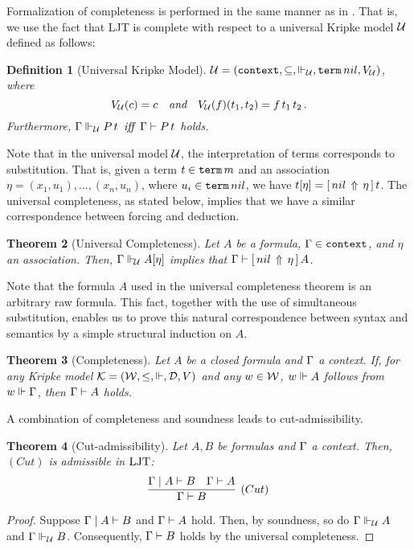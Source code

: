 \documentclass{kms-j}
\theoremstyle{plain}
\newtheorem{thm}{Theorem}[section]
\newtheorem{defi}[thm]{Definition}
\theoremstyle{remark}
\begin{document}
Formalization of completeness is performed in the same manner as in \citep{wollic09}.
That is, we use the fact that LJT is complete with respect to a universal Kripke model
$\calu$ defined as follows:

\begin{defi}[Universal Kripke Model]\label{def:universal}
$\calu = (\tcontext, \subseteq, \Vd_\calu, \tpterm\, nil, V_\calu)$, where
  \[
  V_\calu(c) = c \quad\textit{and}\quad V_\calu(f)(t_1, t_2) = f\, t_1\, t_2\, .
  \]
Furthermore, $\Ga \Vd_\calu P\, t \textit{ \,iff\, } \Ga \vd P\,t$ holds.
\end{defi}

Note that in the universal model $\calu$, the interpretation of
terms corresponds to substitution. That is, given a term $t \in\tpterm
\, m$ and an association $\eta = (x_1,u_1),...,(x_n, u_n)$, where $u_i
\in \tterm \,nil$, we have $t[\eta] = \substa{t}{\eta}{nil}$. The universal completeness, as stated
below, implies that we have a similar correspondence between forcing and deduction.

\begin{thm}[Universal Completeness]\label{universal}
  Let $A$ be a formula, $\Ga \in \tcontext$, and $\eta$ an
  association. Then, $\Ga \Vd_{\!\calu} A [\eta]$ implies that $\Ga \vd  \substa{A}{\eta}{nil}$.
\end{thm}

Note that the formula $A$ used in the universal completeness theorem is an arbitrary raw formula.
This fact, together with the use of simultaneous substitution, enables us to prove this natural correspondence
between syntax and semantics by a simple structural induction on $A$.

\begin{thm}[Completeness]\label{completeness}
  Let $A$ be a closed formula and $\Ga$ a context. If, for any Kripke model
  $\calk = (\calw, \le, \Vd, \cald, V)$ and any $w \in \calw$, $w \Vd A$
  follows from $w \Vd \Ga$, then $\Ga \vd A$ holds.
\end{thm}


A combination of completeness and soundness leads to cut-admissibility.

\begin{thm}[Cut-admissibility]
  Let $A, B$ be formulas and $\Ga$ a context. Then, $(Cut)$ is admissible in $\ljt$:
  \begin{equation*}
    \vcenter{\infer[(Cut)]{\Ga \vd B}{\Ga \mid A \vd B & \Ga \vd A}}
  \end{equation*}
\end{thm}
\begin{proof}
Suppose $\Ga \mid A \vd B$ and $\Ga \vd A$ hold.
Then, by soundness, so do $\Ga \Vd_\calu A$ and $\Ga \Vd_\calu B$.
Consequently, $\Ga \vd B$ holds by the universal completeness.
\end{proof}
\end{document}

